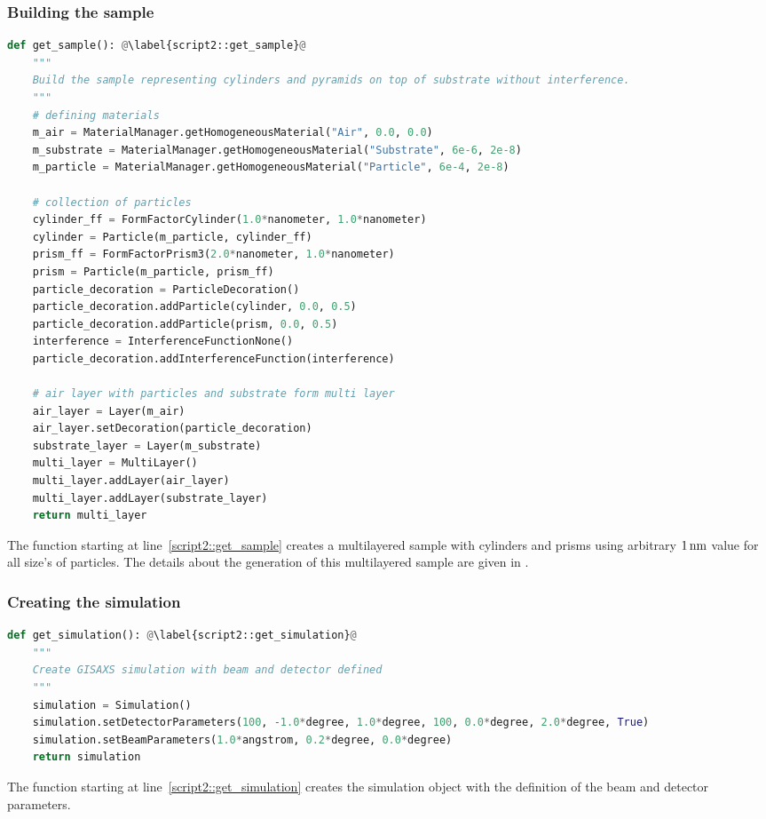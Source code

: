 \subsubsection*{Building the sample}
\begin{lstlisting}[language=python, style=eclipseboxed, firstnumber=5]
def get_sample(): @\label{script2::get_sample}@
    """
    Build the sample representing cylinders and pyramids on top of substrate without interference.
    """
    # defining materials
    m_air = MaterialManager.getHomogeneousMaterial("Air", 0.0, 0.0)
    m_substrate = MaterialManager.getHomogeneousMaterial("Substrate", 6e-6, 2e-8)
    m_particle = MaterialManager.getHomogeneousMaterial("Particle", 6e-4, 2e-8)

    # collection of particles
    cylinder_ff = FormFactorCylinder(1.0*nanometer, 1.0*nanometer)
    cylinder = Particle(m_particle, cylinder_ff)
    prism_ff = FormFactorPrism3(2.0*nanometer, 1.0*nanometer)
    prism = Particle(m_particle, prism_ff)
    particle_decoration = ParticleDecoration()
    particle_decoration.addParticle(cylinder, 0.0, 0.5)
    particle_decoration.addParticle(prism, 0.0, 0.5)
    interference = InterferenceFunctionNone()
    particle_decoration.addInterferenceFunction(interference)

    # air layer with particles and substrate form multi layer
    air_layer = Layer(m_air)
    air_layer.setDecoration(particle_decoration)
    substrate_layer = Layer(m_substrate)
    multi_layer = MultiLayer()
    multi_layer.addLayer(air_layer)
    multi_layer.addLayer(substrate_layer)
    return multi_layer
\end{lstlisting}
The function starting at line~\ref{script2::get_sample} creates a multilayered sample
with cylinders and prisms using arbitrary $1\,{\rm nm}$ value for all size's of particles.
The details about the generation of this multilayered sample are given in .


\subsubsection*{Creating the simulation}
\begin{lstlisting}[language=python, style=eclipseboxed, firstnumber=35]
def get_simulation(): @\label{script2::get_simulation}@
    """
    Create GISAXS simulation with beam and detector defined
    """
    simulation = Simulation()
    simulation.setDetectorParameters(100, -1.0*degree, 1.0*degree, 100, 0.0*degree, 2.0*degree, True)
    simulation.setBeamParameters(1.0*angstrom, 0.2*degree, 0.0*degree)
    return simulation
\end{lstlisting}
The function starting at line~\ref{script2::get_simulation} creates
the simulation object with the definition of the beam and detector parameters.



